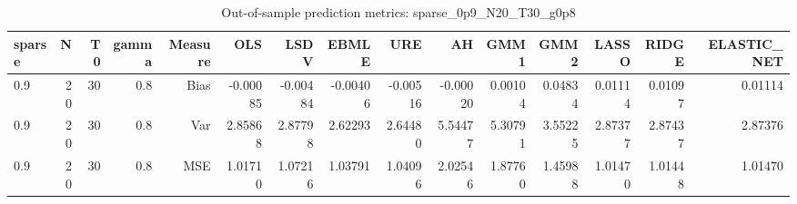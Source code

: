 \begin{table}[!htbp]\centering
\caption{Out-of-sample prediction metrics: sparse_0p9_N20_T30_g0p8}
\label{tab:table3_sparse_0p9_N20_T30_g0p8}
\begin{tabular}{lrrrrrrrrrrrrrr}
\hline
sparse & N & T0 & gamma & Measure & OLS & LSDV & EBMLE & URE & AH & GMM1 & GMM2 & LASSO & RIDGE & ELASTIC_NET \\
\hline
0.9 & 20 & 30 & 0.8 & Bias & -0.00085 & -0.00484 & -0.00406 & -0.00516 & -0.00020 & 0.00104 & 0.04834 & 0.01114 & 0.01097 & 0.01114 \\
0.9 & 20 & 30 & 0.8 & Var & 2.85868 & 2.87798 & 2.62293 & 2.64480 & 5.54477 & 5.30791 & 3.55225 & 2.87377 & 2.87437 & 2.87376 \\
0.9 & 20 & 30 & 0.8 & MSE & 1.01710 & 1.07216 & 1.03791 & 1.04096 & 2.02546 & 1.87760 & 1.45988 & 1.01470 & 1.01448 & 1.01470 \\
\hline
\end{tabular}
\end{table}

